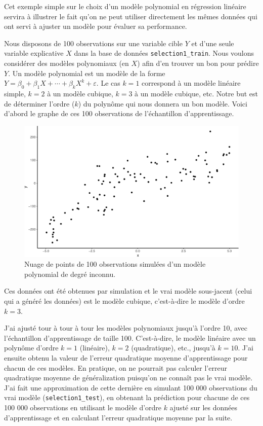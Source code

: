 \documentclass[
  11pt,
  letterpaper,
]{book}
\theoremstyle{definition}
\theoremstyle{remark}
\begin{document}
Cet exemple simple sur le choix d'un modèle polynomial en régression
linéaire servira à illustrer le fait qu'on ne peut utiliser directement
les mêmes données qui ont servi à ajuster un modèle pour évaluer sa
performance.

Nous disposons de 100 observations sur une variable cible \(Y\) et d'une
seule variable explicative \(X\) dans la base de données
\texttt{selection1\_train}. Nous voulons considérer des modèles
polynomiaux (en \(X\)) afin d'en trouver un bon pour prédire \(Y\). Un
modèle polynomial est un modèle de la forme
\(Y=\beta_0 + \beta_1X+\cdots+\beta_kX^k+\varepsilon\). Le cas \(k=1\)
correspond à un modèle linéaire simple, \(k=2\) à un modèle cubique,
\(k=3\) à un modèle cubique, etc. Notre but est de déterminer l'ordre
(\(k\)) du polynôme qui nous donnera un bon modèle. Voici d'abord le
graphe de ces 100 observations de l'échantillon d'apprentissage.

\begin{figure}[ht!]

{\centering \includegraphics[width=1\textwidth,height=\textheight]{./04-selectionmodeles_files/figure-pdf/fig-donneestest-1.pdf}

}

\caption{\label{fig-donneestest}Nuage de points de 100 observations
simulées d'un modèle polynomial de degré inconnu.}

\end{figure}

Ces données ont été obtenues par simulation et le vrai modèle
sous-jacent (celui qui a généré les données) est le modèle cubique,
c'est-à-dire le modèle d'ordre \(k=3\).

J'ai ajusté tour à tour à tour les modèles polynomiaux jusqu'à l'ordre
10, avec l'échantillon d'apprentissage de taille 100. C'est-à-dire, le
modèle linéaire avec un polynôme d'ordre \(k=1\) (linéaire), \(k=2\)
(quadratique), etc., jusqu'à \(k=10\). J'ai ensuite obtenu la valeur de
l'erreur quadratique moyenne d'apprentissage pour chacun de ces modèles.
En pratique, on ne pourrait pas calculer l'erreur quadratique moyenne de
généralization puisqu'on ne connaît pas le vrai modèle. J'ai fait une
approximation de cette dernière en simulant 100 000 observations du vrai
modèle (\texttt{selection1\_test}), en obtenant la prédiction pour
chacune de ces 100 000 observations en utilisant le modèle d'ordre \(k\)
ajusté sur les données d'apprentissage et en calculant l'erreur
quadratique moyenne par la suite.
\end{document}
